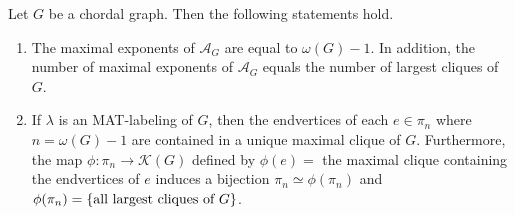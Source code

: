 \documentclass[ALCO, Unicode,published]{cedram}
\newcommand{\mcK}{\mathcal{K}}
\begin{document}
\begin{proposition}\label{the number of maximal exponents = the number of largest cliques}
Let $ G $ be a chordal graph. Then the following statements hold. 
\begin{enumerate}[(1)]
\item The maximal exponents of $ \mathcal{A}_{G} $ are equal to $ \omega(G)-1 $. 
In addition, the number of maximal exponents of $ \mathcal{A}_{G} $ equals the number of largest cliques of $ G $.  
\item  If $ \lambda $ is an MAT-labeling of  $ G $, then the endvertices of each $ e \in  \pi_{n}$ where $n = \omega(G)-1$ are contained in a unique maximal clique of $G$. 
Furthermore, the map $ \phi : \pi_{n} \to \mcK(G)$ defined by $\phi(e)=$ the maximal clique containing the endvertices of $ e$ induces a bijection $ \pi_{n} \simeq \phi(\pi_{n})$ and $\phi(\pi_{n})=\{\mbox{all largest cliques of $ G $}\}$. 
\end{enumerate}
 
\end{proposition}
\end{document}

